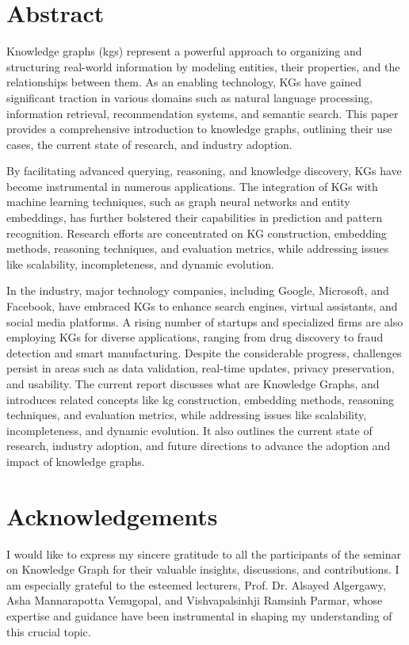 \documentclass[12pt]{article} %
\title{\thetitle}
\author{\theauthor}
\date{April-Mai 2023}
\begin{document}

\newpage


\section*{Abstract}
Knowledge graphs (\acrshort{kg}s) represent a powerful approach to organizing and structuring real-world information by modeling entities, their properties, and the relationships between them. As an enabling technology, KGs have gained significant traction in various domains such as natural language processing, information retrieval, recommendation systems, and semantic search. This paper provides a comprehensive introduction to knowledge graphs, outlining their use cases, the current state of research, and industry adoption.

By facilitating advanced querying, reasoning, and knowledge discovery, KGs have become instrumental in numerous applications. The integration of KGs with machine learning techniques, such as graph neural networks and entity embeddings, has further bolstered their capabilities in prediction and pattern recognition. Research efforts are concentrated on KG construction, embedding methods, reasoning techniques, and evaluation metrics, while addressing issues like scalability, incompleteness, and dynamic evolution.

In the industry, major technology companies, including Google, Microsoft, and Facebook, have embraced KGs to enhance search engines, virtual assistants, and social media platforms. A rising number of startups and specialized firms are also employing KGs for diverse applications, ranging from drug discovery to fraud detection and smart manufacturing. Despite the considerable progress, challenges persist in areas such as data validation, real-time updates, privacy preservation, and usability. The current report discusses what are Knowledge Graphs, and introduces related concepts like \acrshort{kg} construction, embedding methods, reasoning techniques, and evaluation metrics, while addressing issues like scalability, incompleteness, and dynamic evolution. It also outlines the current state of research, industry adoption, and future directions to advance the adoption and impact of knowledge graphs.

\section*{Acknowledgements}
I would like to express my sincere gratitude to all the participants of the seminar on Knowledge Graph for their valuable insights, discussions, and contributions. I am especially grateful to the esteemed lecturers, Prof. Dr. Alsayed Algergawy, Asha Mannarapotta Venugopal, and Vishvapalsinhji Ramsinh Parmar, whose expertise and guidance have been instrumental in shaping my understanding of this crucial topic. 
\end{document}
